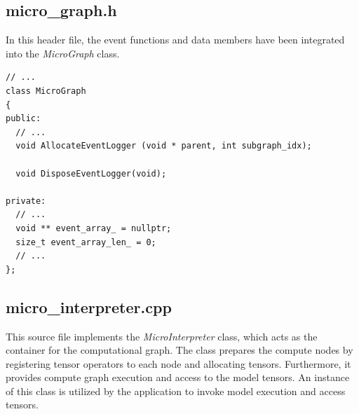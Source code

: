 \subsection*{micro\_graph.h}
In this header file, the event functions and data members have been integrated into the \textit{MicroGraph} class.
\begin{verbatim}
// ...
class MicroGraph
{
public:
  // ...
  void AllocateEventLogger (void * parent, int subgraph_idx);
  
  void DisposeEventLogger(void);
  
private:
  // ...
  void ** event_array_ = nullptr;
  size_t event_array_len_ = 0;
  // ...
};
\end{verbatim}

\subsection*{micro\_interpreter.cpp}
This source file implements the \textit{MicroInterpreter} class, which acts as the container for the computational graph. The class prepares the compute nodes by registering tensor operators to each node and allocating tensors. Furthermore, it provides compute graph execution and access to the model tensors. An instance of this class is utilized by the application to invoke model execution and access tensors.

